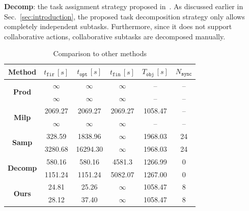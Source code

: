 \textbf{Decomp}: the task assignment strategy proposed
in~\citep{schillinger2018simultaneous}.
As discussed earlier in Sec.~\ref{sec:introduction},
the proposed task decomposition strategy only allows completely
independent subtasks.
Furthermore, since it does not support collaborative actions,
collaborative subtasks are decomposed manually.
\begin{table}
  \centering
	\caption{Comparison to other methods}
	\label{table:compare_time}
        \footnotesize
	\begin{tabular}{|c|c|c|c|c|c|}\hline
	   Method &  $t_{\texttt{fir}}\, [s]$
          &  $t_{\texttt{opt}}\, [s]$
	  &  $t_{\texttt{fin}}\,[s]$ & $T_{\texttt{obj}}\,[s]$
          &  $N_{\texttt{sync}}$ \\ \hline
		\multirow{2}{*}{\textbf{Prod}}& $\infty$ & $\infty$ & $\infty$ & -- & -- \\
                 & $\infty$ & $\infty$ & $\infty$ & -- & -- \\
                \hline
		\multirow{2}{*}{\textbf{Milp}} & 2069.27 & 2069.27 & 2069.27 & 1058.47 & -- \\
                &$\infty$ &$\infty$ & $\infty$ & -- & --  \\
                \hline
		\multirow{2}{*}{\textbf{Samp}} & 328.59 & 1838.96 & $\infty$ & 1968.03 & 24 \\
                 & 3280.68 &  16294.30 & $\infty$ & 1968.03 & 24 \\
                \hline
		\multirow{2}{*}{\textbf{Decomp}} & 580.16 & 580.16 & 4581.3 & 1266.99 & 0 \\
		 & 1151.24 & 1151.24 & 5082.07 & 1267.00 & 0 \\
                \hline
		\multirow{2}{*}{\textbf{Ours}} & 24.81 & 25.26 & $\infty$ & 1058.47 & 8 \\
                 & 28.12 & 37.40 & $\infty$ & 1058.47 & 8 \\
		\hline
	\end{tabular}
\end{table}

